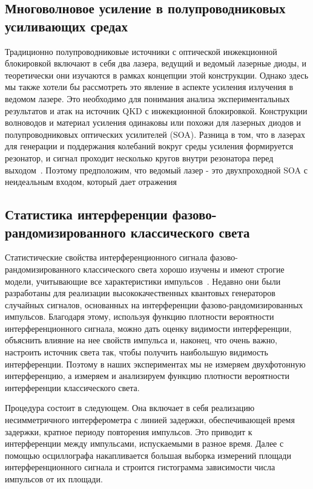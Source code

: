 \subsection{Многоволновое усиление в полупроводниковых усиливающих средах}

Традиционно полупроводниковые источники с оптической инжекционной блокировкой включают в себя два лазера, ведущий и ведомый лазерные диоды, и теоретически они изучаются в рамках концепции этой конструкции. Однако здесь мы также хотели бы рассмотреть это явление в аспекте усиления излучения в ведомом лазере. Это необходимо для понимания анализа экспериментальных результатов и атак на источник QKD с инжекционной блокировкой. Конструкции волноводов и материал усиления одинаковы или похожи для лазерных диодов и полупроводниковых оптических усилителей (SOA). Разница в том, что в лазерах для генерации и поддержания колебаний вокруг среды усиления формируется резонатор, и сигнал проходит несколько кругов внутри резонатора перед выходом~\cite{chen2022}. Поэтому предположим, что ведомый лазер - это двухпроходной SOA с неидеальным входом, который дает отражения
\subsection{Статистика интерференции фазово-рандомизированного классического света}

Статистические свойства интерференционного сигнала фазово-рандомизированного классического света хорошо изучены и имеют строгие модели, учитывающие все характеристики импульсов~\cite{shakhovoy2020,shakhovoy2021}. Недавно они были разработаны для реализации высококачественных квантовых генераторов случайных сигналов, основанных на интерференции фазово-рандомизированных импульсов. Благодаря этому, используя функцию плотности вероятности интерференционного сигнала, можно дать оценку видимости интерференции, объяснить влияние на нее свойств импульса и, наконец, что очень важно, настроить источник света так, чтобы получить наибольшую видимость интерференции. Поэтому в наших экспериментах мы не измеряем двухфотонную интерференцию, а измеряем и анализируем функцию плотности вероятности интерференции классического света.   

Процедура состоит в следующем. Она включает в себя реализацию несимметричного интерферометра с линией задержки, обеспечивающей время задержки, кратное периоду повторения импульсов. Это приводит к интерференции между импульсами, испускаемыми в разное время. Далее с помощью осциллографа накапливается большая выборка измерений площади интерференционного сигнала и строится гистограмма зависимости числа импульсов от их площади.

